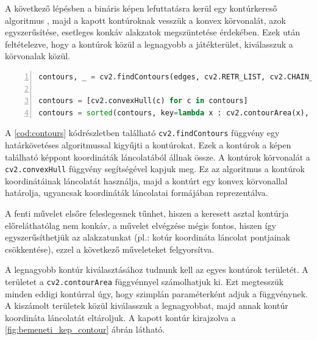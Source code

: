 \par A következő lépésben a bináris képen lefuttatásra kerül egy kontúrkereső algoritmus \cite{SUZUKI198532}, majd a kapott kontúroknak vesszük a konvex körvonalát, azok egyszerűsítése, esetleges konkáv alakzatok megszüntetése érdekében. Ezek után feltételezve, hogy a kontúrok közül a legnagyobb a játékterület, kiválasszuk a körvonalak közül.

\vspace{2mm}
\hspace{-10mm}
\begin{minipage}{\linewidth}
\begin{lstlisting}[language=Python, numbers=left, caption={Kontúrok keresése.}, label={cod:contours}]
contours, _ = cv2.findContours(edges, cv2.RETR_LIST, cv2.CHAIN_APPROX_SIMPLE)

contours = [cv2.convexHull(c) for c in contours]
contours = sorted(contours, key=lambda x : cv2.contourArea(x), reverse=True)[:1]
\end{lstlisting}
\end{minipage}

\par A \ref{cod:contours} kódrészletben található \lstinline{cv2.findContours} függvény \cite{opencv_docs, SUZUKI198532} egy határkövetéses algoritmussal kigyűjti a kontúrokat. Ezek a kontúrok a képen található képpont koordináták láncolatából állnak össze. A kontúrok körvonalát a \lstinline{cv2.convexHull} függvény \cite{opencv_docs, SKLANSKY198279} segítségével kapjuk meg. Ez az algoritmus a kontúrok koordinátáinak láncolatát használja, majd a kontúrt egy konvex körvonallal határolja, ugyancsak koordináták láncolatai formájában reprezentálva.
\par A fenti művelet elsőre feleslegesnek tűnhet, hiszen a keresett asztal kontúrja előreláthatólag nem konkáv, a művelet elvégzése mégis fontos, hiszen így egyszerűsíthetjük az alakzatunkat (pl.: kotúr koordináta láncolat pontjainak csökkentése), ezzel a következő műveleteket felgyorsítva.
\par A legnagyobb kontúr kiválasztásához tudnunk kell az egyes kontúrok területét. A területet a \lstinline{cv2.contourArea} függvénnyel \cite{opencv_docs} számolhatjuk ki. Ezt megtesszük minden eddigi kontúrral úgy, hogy szimplán paraméterként adjuk a függvénynek. A kiszámolt területek közül kiválasszuk a legnagyobbat, majd annak kontúr koordináta láncolatát eltároljuk. A kapott kontúr kirajzolva a \ref{fig:bemeneti_kep_contour} ábrán látható.

